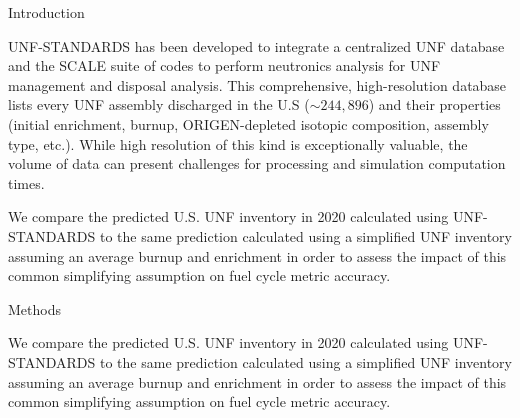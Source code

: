 \documentclass[final]{beamer}
\newlength{\onecolwid}
\newlength{\threecolwid}
\begin{document}
\begin{frame}[t]
\begin{columns}[t,totalwidth=\threecolwid]
\begin{column}{\onecolwid}
\begin{block}{Introduction}

\gls{UNF-STANDARDS} has been developed to integrate
a centralized \gls{UNF} database \cite{peterson_used_2013} and the SCALE suite of codes \cite{noauthor_scale_nodate} to
perform neutronics analysis for
\gls{UNF} management and disposal analysis.
This comprehensive, high-resolution database lists every \gls{UNF} assembly discharged 
in the U.S ($\sim244,896$) and their properties
(initial enrichment, burnup, ORIGEN-depleted isotopic composition, assembly type, etc.).
While high resolution of this kind is exceptionally valuable, the volume of data can 
present challenges for processing and simulation computation times.

We compare the predicted U.S. \gls{UNF} inventory in 2020 calculated using
\gls{UNF-STANDARDS} to the same prediction calculated using a simplified \gls{UNF} 
inventory assuming an average burnup and enrichment in order to assess the impact of this common simplifying assumption on fuel cycle metric accuracy.

\end{block}


\begin{block}{Methods}

We compare the predicted U.S. \gls{UNF} inventory in 2020 calculated using
\gls{UNF-STANDARDS} to the same prediction calculated using a simplified \gls{UNF} 
inventory assuming an average burnup and enrichment in order to assess the impact of this common simplifying assumption on fuel cycle metric accuracy.


\end{block}
\end{column}
\end{columns}
\end{frame}
\end{document}
